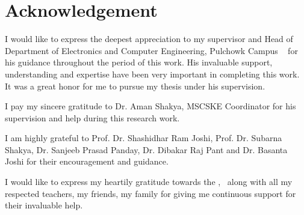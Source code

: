 \chapter*{Acknowledgement}


I would like to express the deepest appreciation to my supervisor and Head of Department of Electronics and Computer Engineering, Pulchowk Campus \myadvisorA~ for his guidance throughout the period of this work. His invaluable support, understanding and expertise have been very important in completing this work. It was a great honor for me to pursue my thesis under his supervision.

I pay my sincere gratitude to Dr. Aman Shakya, MSCSKE Coordinator for his supervision and help during this research work.

I am highly grateful to Prof. Dr. Shashidhar Ram Joshi, Prof. Dr. Subarna Shakya, Dr. Sanjeeb Prasad Panday, Dr. Dibakar Raj Pant and Dr. Basanta Joshi for their encouragement and guidance.

I would like to express my heartily gratitude towards the \myinstitute, \mycampus ~along with all my respected teachers, my friends, my family for giving me continuous support for their invaluable help.


{\bf{\theauthor}}

{\bf{\roll}}


{\bf{\myinstitute}}



